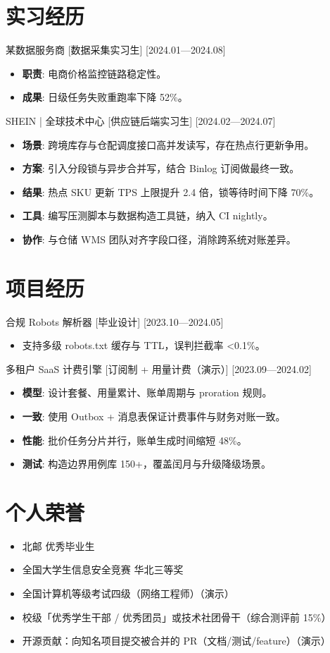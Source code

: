 \documentclass{resume-photo}
\begin{document}
\section{实习经历}
\ResumeItem
{某数据服务商}
[\textnormal{数据采集实习生}]
[2024.01—2024.08]

\begin{itemize}
  \item \textbf{职责}: 电商价格监控链路稳定性。
  \item \textbf{成果}: 日级任务失败重跑率下降 52\%。
\end{itemize}


\ResumeItem
{SHEIN | 全球技术中心}
[\textnormal{供应链后端实习生}]
[2024.02—2024.07]

\begin{itemize}
  \item \textbf{场景}: 跨境库存与仓配调度接口高并发读写，存在热点行更新争用。
  \item \textbf{方案}: 引入分段锁与异步合并写，结合 Binlog 订阅做最终一致。
  \item \textbf{结果}: 热点 SKU 更新 TPS 上限提升 2.4 倍，锁等待时间下降 70\%。
  \item \textbf{工具}: 编写压测脚本与数据构造工具链，纳入 CI nightly。
  \item \textbf{协作}: 与仓储 WMS 团队对齐字段口径，消除跨系统对账差异。
\end{itemize}



\section{项目经历}
\ResumeItem
{合规 Robots 解析器}
[\textnormal{毕业设计}]
[2023.10—2024.05]

\begin{itemize}
  \item 支持多级 robots.txt 缓存与 TTL，误判拦截率 <0.1\%。
\end{itemize}


\ResumeItem
{多租户 SaaS 计费引擎}
[\textnormal{订阅制 + 用量计费（演示）}]
[2023.09—2024.02]

\begin{itemize}
  \item \textbf{模型}: 设计套餐、用量累计、账单周期与 proration 规则。
  \item \textbf{一致}: 使用 Outbox + 消息表保证计费事件与财务对账一致。
  \item \textbf{性能}: 批价任务分片并行，账单生成时间缩短 48\%。
  \item \textbf{测试}: 构造边界用例库 150+，覆盖闰月与升级降级场景。
\end{itemize}



\section{个人荣誉}
\begin{itemize}
  \item 北邮 优秀毕业生
  \item 全国大学生信息安全竞赛 华北三等奖
  \item 全国计算机等级考试四级（网络工程师）（演示）
  \item 校级「优秀学生干部 / 优秀团员」或技术社团骨干（综合测评前 15\%）
  \item 开源贡献：向知名项目提交被合并的 PR（文档/测试/feature）（演示）
\end{itemize}
\end{document}
